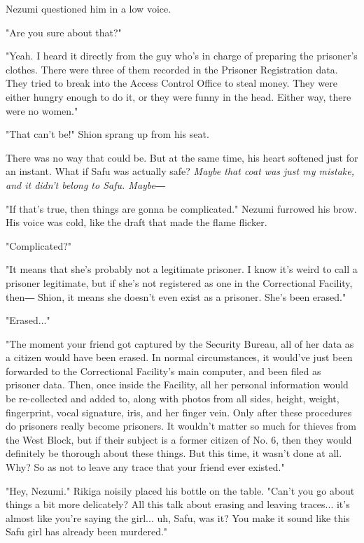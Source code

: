 Nezumi questioned him in a low voice.

"Are you sure about that?"

"Yeah. I heard it directly from the guy who's in charge of preparing the
prisoner's clothes. There were three of them recorded in the Prisoner
Registration data. They tried to break into the Access Control Office to
steal money. They were either hungry enough to do it, or they were funny
in the head. Either way, there were no women."

"That can't be!" Shion sprang up from his seat.

There was no way that could be. But at the same time, his heart softened
just for an instant. What if Safu was actually safe? \emph{Maybe that coat was
just my mistake, and it didn't belong to Safu. Maybe―}

"If that's true, then things are gonna be complicated." Nezumi furrowed
his brow. His voice was cold, like the draft that made the flame
flicker.

"Complicated?"

"It means that she's probably not a legitimate prisoner. I know it's
weird to call a prisoner legitimate, but if she's not registered as one
in the Correctional Facility, then― Shion, it means she doesn't even
exist as a prisoner. She's been erased."

"Erased..."

"The moment your friend got captured by the Security Bureau, all of her
data as a citizen would have been erased. In normal circumstances, it
would've just been forwarded to the Correctional Facility's main
computer, and been filed as prisoner data. Then, once inside the
Facility, all her personal information would be re-collected and added
to, along with photos from all sides, height, weight, fingerprint, vocal
signature, iris, and her finger vein. Only after these procedures do
prisoners really become prisoners. It wouldn't matter so much for
thieves from the West Block, but if their subject is a former citizen of
No. 6, then they would definitely be thorough about these things. But
this time, it wasn't done at all. Why? So as not to leave any trace that
your friend ever existed."

"Hey, Nezumi." Rikiga noisily placed his bottle on the table. "Can't you
go about things a bit more delicately? All this talk about erasing and
leaving traces... it's almost like you're saying the girl... uh, Safu,
was it? You make it sound like this Safu girl has already been
murdered."

